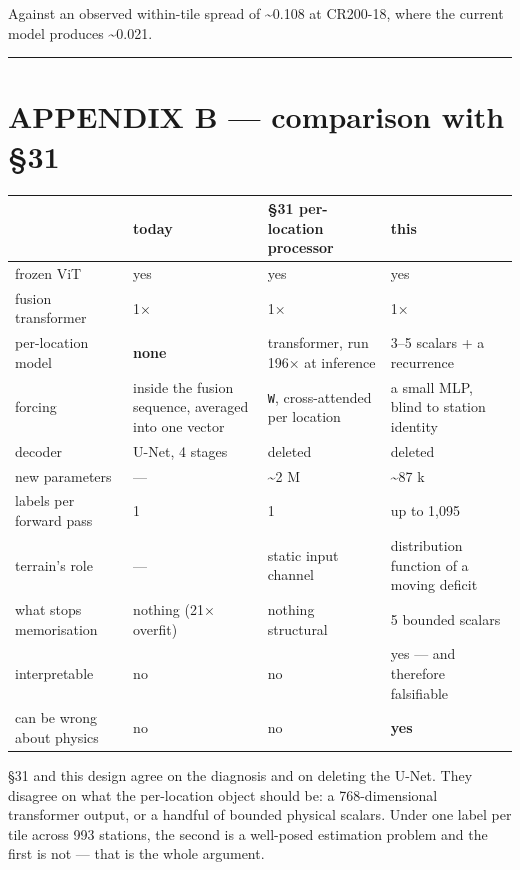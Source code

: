 \documentclass[10pt,a4paper]{article}
\begin{document}
Against an observed within-tile spread of \textasciitilde{}0.108 at CR200-18, where the current
model produces \textasciitilde{}0.021.

\medskip\hrule\medskip

\section*{APPENDIX B — comparison with §31}

\begin{center}
\small
\begin{tabularx}{\linewidth}{XXXX}
\toprule
\textbf{} & \textbf{today} & \textbf{§31 per-location processor} & \textbf{this} \\
\midrule
frozen ViT & yes & yes & yes \\
fusion transformer & 1× & 1× & 1× \\
per-location model & \textbf{none} & transformer, run 196× at inference & 3–5 scalars + a recurrence \\
forcing & inside the fusion sequence, averaged into one vector & \texttt{W}, cross-attended per location & a small MLP, blind to station identity \\
decoder & U-Net, 4 stages & deleted & deleted \\
new parameters & — & \textasciitilde{}2 M & \textasciitilde{}87 k \\
labels per forward pass & 1 & 1 & up to 1,095 \\
terrain's role & — & static input channel & distribution function of a moving deficit \\
what stops memorisation & nothing (21× overfit) & nothing structural & 5 bounded scalars \\
interpretable & no & no & yes — and therefore falsifiable \\
can be wrong about physics & no & no & \textbf{yes} \\
\bottomrule
\end{tabularx}
\end{center}

§31 and this design agree on the diagnosis and on deleting the U-Net. They
disagree on what the per-location object should be: a 768-dimensional
transformer output, or a handful of bounded physical scalars. Under one label
per tile across 993 stations, the second is a well-posed estimation problem and
the first is not — that is the whole argument.
\end{document}
